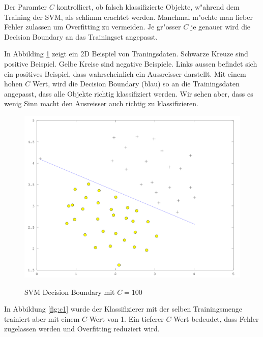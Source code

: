 \documentclass[12pt,a4paper,twoside]{article}
\begin{document}
Der Paramter $C$ kontrolliert, ob falsch klassifizierte Objekte, w"ahrend dem Training der SVM, als schlimm erachtet werden. Manchmal m"ochte man lieber Fehler zulassen um Overfitting zu vermeiden. Je gr"osser $C$ je genauer wird die Decision Boundary an das Trainingset angepasst. 

In Abbilding \ref{fig:c100} zeigt ein 2D Beispiel von Traningsdaten. Schwarze Kreuze sind positive Beispiel. Gelbe Kreise sind negative Beispiele. Links aussen befindet sich ein positives Beispiel, dass wahrscheinlich ein Aussreisser darstellt. Mit einem hohen $C$ Wert, wird die Decision Boundary (blau) so an die Trainingsdaten angepasst, dass alle Objekte richtig klassifiziert werden. Wir sehen aber, dass es wenig Sinn macht den Ausreisser auch richtig zu klassifizieren.

\begin{figure}
  \includegraphics[scale=0.5]{c100}
  \centering
  \label{fig:c100}
  \caption{SVM Decision Boundary mit $C = 100$}
\end{figure}

In Abbildung \ref{fig:c1} wurde der Klassifizierer mit der selben Trainingsmenge trainiert aber mit einem $C$-Wert von 1. Ein tieferer $C$-Wert bedeudet, dass Fehler zugelassen werden und Overfitting reduziert wird.
\end{document}

